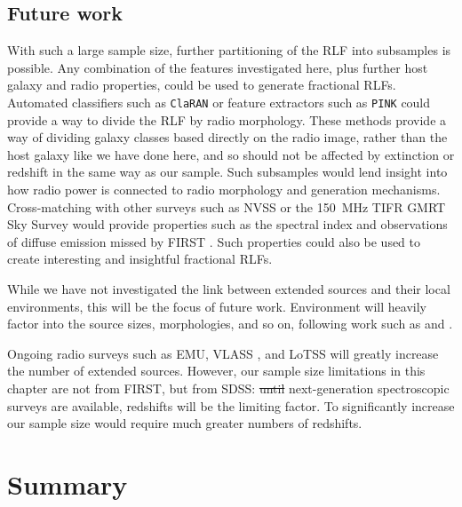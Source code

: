 \documentclass[11pt, a4paper]{book}
\providecommand{\DIFaddtex}[1]{{\protect\color{blue}\uwave{#1}}} %
\providecommand{\DIFdeltex}[1]{{\protect\color{red}\sout{#1}}}                      %
\providecommand{\DIFaddbegin}{} %
\providecommand{\DIFaddend}{} %
\providecommand{\DIFdelbegin}{} %
\providecommand{\DIFdelend}{} %
\providecommand{\DIFadd}[1]{\texorpdfstring{\DIFaddtex{#1}}{#1}} %
\providecommand{\DIFdel}[1]{\texorpdfstring{\DIFdeltex{#1}}{}} %
\newcommand{\DIFscaledelfig}{0.5}
\newlength{\DIFdelgraphicswidth} %
\newlength{\DIFdelgraphicsheight} %
\newcommand{\DIFaddincludegraphics}[2][]{{\color{blue}\fbox{\DIFOincludegraphics[#1]{#2}}}} %
\newcommand{\DIFdelincludegraphics}[2][]{%
\sbox{\DIFdelgraphicsbox}{\DIFOincludegraphics[#1]{#2}}%
\settoboxwidth{\DIFdelgraphicswidth}{\DIFdelgraphicsbox} %
\settoboxtotalheight{\DIFdelgraphicsheight}{\DIFdelgraphicsbox} %
\scalebox{\DIFscaledelfig}{%
\parbox[b]{\DIFdelgraphicswidth}{\usebox{\DIFdelgraphicsbox}\\[-\baselineskip] \rule{\DIFdelgraphicswidth}{0em}}\llap{\resizebox{\DIFdelgraphicswidth}{\DIFdelgraphicsheight}{%
\setlength{\unitlength}{\DIFdelgraphicswidth}%
\begin{picture}(1,1)%
\thicklines\linethickness{2pt} %
{\color[rgb]{1,0,0}\put(0,0){\framebox(1,1){}}}%
{\color[rgb]{1,0,0}\put(0,0){\line( 1,1){1}}}%
{\color[rgb]{1,0,0}\put(0,1){\line(1,-1){1}}}%
\end{picture}%
}\hspace*{3pt}}} %
} %
\DeclareRobustCommand{\DIFaddbegin}{\DIFOaddbegin \let\includegraphics\DIFaddincludegraphics} %
\DeclareRobustCommand{\DIFaddend}{\DIFOaddend \let\includegraphics\DIFOincludegraphics} %
\DeclareRobustCommand{\DIFdelbegin}{\DIFOdelbegin \let\includegraphics\DIFdelincludegraphics} %
\DeclareRobustCommand{\DIFdelend}{\DIFOaddend \let\includegraphics\DIFOincludegraphics} %
\begin{document}
  \subsection{Future work}

    With such a large sample size, further partitioning of the RLF into subsamples is possible. Any combination of the features investigated here, plus further host galaxy and radio properties, could be used to generate fractional RLFs. Automated classifiers such as \texttt{ClaRAN} \citep{wu19claran} or feature extractors such as \texttt{PINK} \citep{polsterer15pink,galvin19som,ralph19ae} could provide a way to divide the RLF by radio morphology. These methods provide a way of dividing galaxy classes based directly on the radio image, rather than the host galaxy like we have done here, and so should not be affected by extinction or redshift in the same way as our sample. Such subsamples would lend insight into how radio power is connected to radio morphology and generation mechanisms. Cross-matching with other surveys such as NVSS or the 150~MHz TIFR GMRT Sky Survey would provide properties such as the spectral index and observations of diffuse emission missed by FIRST \citep[as used by][]{kimball08}. Such properties could also be used to create interesting and insightful fractional RLFs.

    While we have not investigated the link between extended sources and their local environments, this will be the focus of future work. Environment will heavily factor into the source sizes, morphologies, and so on, following work such as \citet{rodman19asymmetry} and \citet{garon19bending}.

    Ongoing radio surveys such as EMU, VLASS \citep{lacy20vlass}, and LoTSS \linebreak \citep{shimwell19lotss} will greatly increase the number of extended sources. However, our sample size limitations in this chapter are not from FIRST, but from SDSS: \DIFdelbegin \DIFdel{until }\DIFdelend \DIFaddbegin \DIFadd{Until }\DIFaddend next-generation spectroscopic surveys are available, redshifts will be the limiting factor. To significantly increase our sample size would require much greater numbers of redshifts.

\section{Summary}\label{sec:rlfs-summary}
\end{document}
